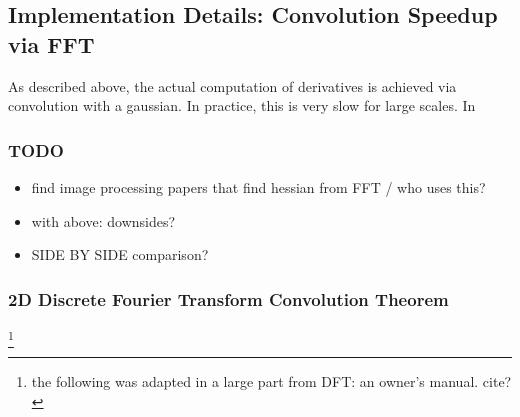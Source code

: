	\subsection{Implementation Details: Convolution Speedup via FFT}
	As described above, the actual computation of derivatives is achieved via convolution with a gaussian. In practice, this is very slow for large scales. In 
		\subsubsection{TODO}
		\begin{itemize}
			\item find image processing papers that find hessian from FFT / who uses this?
			\item with above: downsides?
			\item SIDE BY SIDE comparison?
		\end{itemize}
		
		\subsubsection{2D Discrete Fourier Transform Convolution Theorem}\footnote{the following was adapted in a large part from DFT: an owner's manual. cite?}
		
